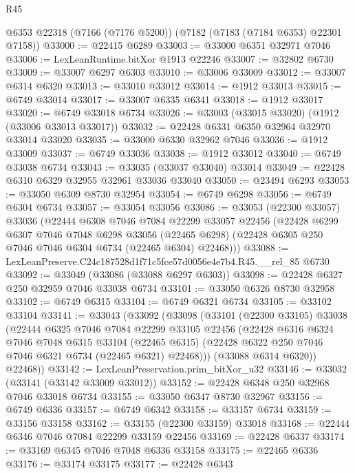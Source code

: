\begin{lexlean}{R45}
\begin{coremodule}
{    @6353
    @22318
    (@7166 (@7176 @5200))
    (@7182 (@7183 (@7184 @6353) @22301 @7158))
@33000 := @22415 @6289
@33003 := @33000 @6351 @32971 @7046
@33006 := LexLeanRuntime.bitXor @1913 @22246
@33007 := @32802 @6730
@33009 := @33007 @6297 @6303
@33010 := @33006 @33009
@33012 := @33007 @6314 @6320
@33013 := @33010 @33012
@33014 := @1912 @33013
@33015 := @6749 @33014
@33017 := @33007 @6335 @6341
@33018 := @1912 @33017
@33020 := @6749 @33018 @6734
@33026 := @33003 (@33015 @33020) (@1912 (@33006 @33013 @33017))
@33032 := @22428 @6331 @6350 @32964 @32970 @33014 @33020
@33035 := @33000 @6330 @32962 @7046
@33036 := @1912 @33009
@33037 := @6749 @33036
@33038 := @1912 @33012
@33040 := @6749 @33038 @6734
@33043 := @33035 (@33037 @33040) @33014
@33049 := @22428 @6310 @6329 @32955 @32961 @33036 @33040
@33050 := @23494 @6293
@33053 := @33050 @6309 @8730 @32954
@33054 := @6749 @6298
@33056 := @6749 @6304 @6734
@33057 := @33054 @33056
@33086 := @33053
    (@22300 @33057)
    @33036
    (@22444
      @6308
      @7046
      @7084
      @22299
      @33057
      @22456
      (@22428
        @6299
        @6307
        @7046
        @7048
        @6298
        @33056
        (@22465 @6298)
        (@22428 @6305 @250 @7046 @7046 @6304 @6734 (@22465 @6304) @22468)))
@33088 := LexLeanPreserve.C24c187528d1f71c5fce57d0056e4e7b4.R45.__rel_85 @6730
@33092 := @33049 (@33086 (@33088 @6297 @6303))
@33098 := @22428 @6327 @250 @32959 @7046 @33038 @6734
@33101 := @33050 @6326 @8730 @32958
@33102 := @6749 @6315
@33104 := @6749 @6321 @6734
@33105 := @33102 @33104
@33141 := @33043
    (@33092
      (@33098
        (@33101
          (@22300 @33105)
          @33038
          (@22444
            @6325
            @7046
            @7084
            @22299
            @33105
            @22456
            (@22428
              @6316
              @6324
              @7046
              @7048
              @6315
              @33104
              (@22465 @6315)
              (@22428 @6322 @250 @7046 @7046 @6321 @6734 (@22465 @6321) @22468)))
          (@33088 @6314 @6320))
        @22468))
@33142 := LexLeanPreservation.prim_bitXor_u32
@33146 := @33032 (@33141 (@33142 @33009 @33012))
@33152 := @22428 @6348 @250 @32968 @7046 @33018 @6734
@33155 := @33050 @6347 @8730 @32967
@33156 := @6749 @6336
@33157 := @6749 @6342
@33158 := @33157 @6734
@33159 := @33156 @33158
@33162 := @33155 (@22300 @33159) @33018
@33168 := @22444 @6346 @7046 @7084 @22299 @33159 @22456
@33169 := @22428 @6337
@33174 := @33169 @6345 @7046 @7048 @6336 @33158
@33175 := @22465 @6336
@33176 := @33174 @33175
@33177 := @22428 @6343
}
\end{coremodule}
\end{lexlean}
